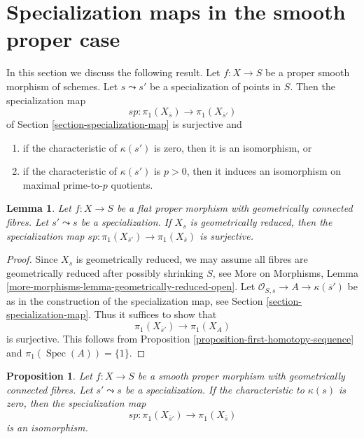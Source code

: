 \documentclass{stacks-project}
\theoremstyle{plain}
\newtheorem{proposition}[subsection]{Proposition}
\newtheorem{lemma}[subsection]{Lemma}
\theoremstyle{definition}
\theoremstyle{remark}
\numberwithin{equation}{subsection}
\def\Spec{\mathop{\mathrm{Spec}}}
\begin{document}
\section{Specialization maps in the smooth proper case}
\label{section-specialization-smooth-proper}

\noindent
In this section we discuss the following result.
Let $f : X \to S$ be a proper smooth morphism of schemes.
Let $s \leadsto s'$ be a specialization of points in $S$.
Then the specialization map
$$
sp : \pi_1(X_{\overline{s}}) \longrightarrow \pi_1(X_{\overline{s}'})
$$
of Section \ref{section-specialization-map}
is surjective and
\begin{enumerate}
\item if the characteristic of $\kappa(s')$ is zero, then it is
an isomorphism, or
\item if the characteristic of $\kappa(s')$ is $p > 0$, then it
induces an isomorphism on maximal prime-to-$p$ quotients.
\end{enumerate}

\begin{lemma}
\label{lemma-specialization-map-surjective}
Let $f : X \to S$ be a flat proper morphism with geometrically
connected fibres. Let $s' \leadsto s$ be a specialization.
If $X_s$ is geometrically reduced, then the specialization
map $sp : \pi_1(X_{\overline{s}'}) \to \pi_1(X_{\overline{s}})$
is surjective.
\end{lemma}

\begin{proof}
Since $X_s$ is geometrically reduced, we may assume all
fibres are geometrically reduced after possibly shrinking $S$, see
More on Morphisms, Lemma \ref{more-morphisms-lemma-geometrically-reduced-open}.
Let $\mathcal{O}_{S, s} \to A \to \kappa(\overline{s}')$ be as
in the construction of the specialization map, see
Section \ref{section-specialization-map}.
Thus it suffices to show that
$$
\pi_1(X_{\overline{s}'}) \to \pi_1(X_A)
$$
is surjective. This follows from
Proposition \ref{proposition-first-homotopy-sequence}
and $\pi_1(\Spec(A)) = \{1\}$.
\end{proof}

\begin{proposition}
\label{proposition-specialization-map-isomorphism}
Let $f : X \to S$ be a smooth proper morphism with geometrically
connected fibres. Let $s' \leadsto s$ be a specialization.
If the characteristic to $\kappa(s)$ is zero, then the specialization
map
$$
sp : \pi_1(X_{\overline{s}'}) \to \pi_1(X_{\overline{s}})
$$
is an isomorphism.
\end{proposition}
\end{document}
